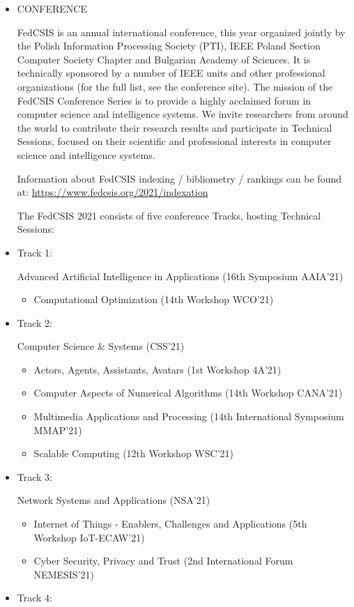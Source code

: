 \documentclass[prodmode,acmtecs]{acmsmall} %
\begin{document}
\begin{itemize}\item  CONFERENCE 
 
  FedCSIS is an annual international conference, this year organized jointly by the Polish Information Processing Society (PTI), IEEE Poland Section Computer Society Chapter and Bulgarian Academy of Sciences. It is technically sponsored by a number of IEEE units and other professional organizations (for the full list, see the conference site). The mission of the FedCSIS Conference Series is to provide a highly acclaimed forum in computer science and intelligence systems. We invite researchers from around the world to contribute their research results and participate in Technical Sessions, focused on their scientific and professional interests in computer science and intelligence systems. 
 
  Information about FedCSIS indexing / bibliometry / rankings can be found at: \href{https://www.fedcsis.org/2021/indexation}{https://www.fedcsis.org/2021/indexation} 
 
  The FedCSIS 2021 consists of five conference Tracks, hosting Technical Sessions:  
 
\item  Track 1: 
 
  Advanced Artificial Intelligence in Applications (16th Symposium AAIA'21) 
 
\begin{itemize}\item  Computational Optimization (14th Workshop WCO'21)
\end{itemize} 
\item  Track 2: 
 
  Computer Science \& Systems (CSS'21) 
 
\begin{itemize}\item  Actors, Agents, Assistants, Avatars (1st Workshop 4A'21)
\item  Computer Aspects of Numerical Algorithms (14th Workshop CANA'21)
\item  Multimedia Applications and Processing (14th International Symposium MMAP'21)
\item  Scalable Computing (12th Workshop WSC'21)
\end{itemize} 
\item  Track 3: 
 
  Network Systems and Applications (NSA'21) 
 
\begin{itemize}\item  Internet of Things - Enablers, Challenges and Applications (5th Workshop IoT-ECAW'21)
\item  Cyber Security, Privacy and Trust (2nd International Forum NEMESIS'21)
\end{itemize} 
\item  Track 4: 
 

\end{itemize}
\end{document}
